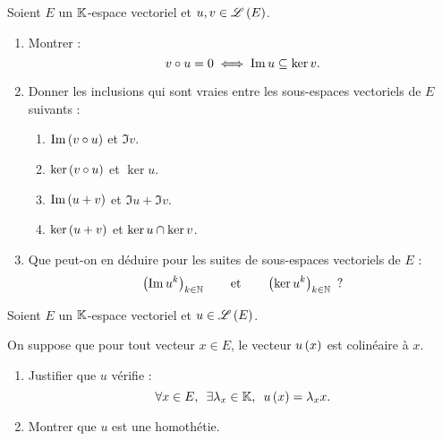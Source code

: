 \begin{exo}
Soient \(E\) un \(\mathbb{K}\)-espace vectoriel et \(u,v\in\mathscr{L}\left(E\right)\).

\begin{enumerate}
\item Montrer : \[v\circ u=0\iff\operatorname{Im} u\subseteq\ker v.\]

\item Donner les inclusions qui sont vraies entre les sous-espaces vectoriels de \(E\) suivants :

\begin{enumerate}
\item \(\operatorname{Im}\left(v\circ u\right)\) et \(\Im v\). \\

\item \(\ker\left(v\circ u\right)\) et \(\ker u\). \\

\item \(\operatorname{Im}\left(u+v\right)\) et \(\Im u+\Im v\). \\

\item \(\ker\left(u+v\right)\) et \(\ker u\cap\ker v\). \\
\end{enumerate}

\item Que peut-on en déduire pour les suites de sous-espaces vectoriels de \(E\) : \[\left(\operatorname{Im} u^k\right)_{k\in\mathbb{N}}\qquad\text{et}\qquad\left(\ker u^k\right)_{k\in\mathbb{N}}\text{ ?}\]
\end{enumerate}
\end{exo}

\begin{corr}
\end{corr}

\begin{exo}[Classique]
Soient \(E\) un \(\mathbb{K}\)-espace vectoriel et \(u\in\mathscr{L}\left(E\right)\).

On suppose que pour tout vecteur \(x\in E\), le vecteur \(u\left(x\right)\) est colinéaire à \(x\).

\begin{enumerate}
\item Justifier que \(u\) vérifie : \[\quantifs{\forall x\in E;\exists\lambda_x\in\K}u\paren{x}=\lambda_xx.\]

\item Montrer que \(u\) est une homothétie.
\end{enumerate}
\end{exo}

